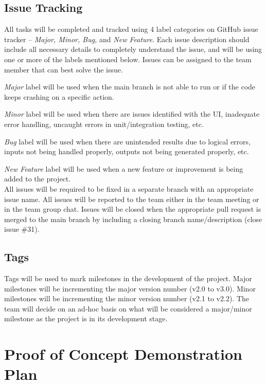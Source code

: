 \documentclass{article}
\begin{document}
\subsection{Issue Tracking}
All tasks will be completed and tracked using 4 label categories on GitHub issue tracker – \emph{Major, Minor, Bug,} and \emph{New Feature}. Each issue description should include all necessary details to completely understand the issue, and will be using one or more of the labels mentioned below. Issues can be assigned to the team member that can best solve the issue.

\emph{Major} label will be used when the main branch is not able to run or if the code keeps crashing on a specific action.

\emph{Minor} label will be used when there are issues identified with the UI, inadequate error handling, uncaught errors in unit/integration testing, etc.

\emph{Bug} label will be used when there are unintended results due to logical errors, inputs not being handled properly, outputs not being generated properly, etc.

\emph{New Feature} label will be used when a new feature or improvement is being added to the project.
\\All issues will be required to be fixed in a separate branch with an appropriate issue name. All issues will be reported to the team either in the team meeting or in the team group chat. Issues will be closed when the appropriate pull request is merged to the main branch by including a closing branch name/description (close issue \#31).

\subsection{Tags}
Tags will be used to mark milestones in the development of the project. Major milestones will be incrementing the major version number (v2.0 to v3.0). Minor milestones will be incrementing the minor version number (v2.1 to v2.2). The team will decide on an ad-hoc basis on what will be considered a major/minor milestone as the project is in its development stage.

\section{Proof of Concept Demonstration Plan}
\end{document}
